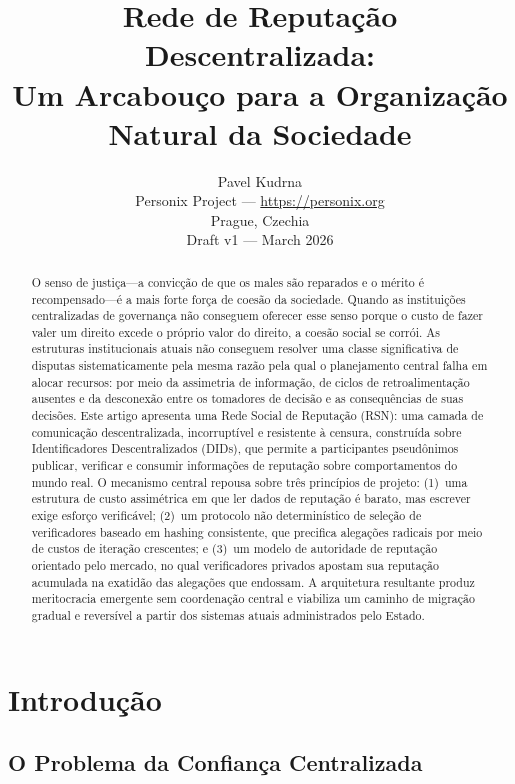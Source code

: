 \documentclass[11pt,a4paper,twocolumn]{article}
\title{\textbf{Rede de Reputação Descentralizada:\\Um Arcabouço para a Organização Natural da Sociedade}}
\author{Pavel Kudrna\\Personix Project --- \url{https://personix.org}\\Prague, Czechia\\Draft v1 --- March 2026}
\date{}
\begin{document}
\maketitle

\begin{abstract}
O senso de justiça---a convicção de que os males são reparados e o mérito é recompensado---é a mais forte força de coesão da sociedade. Quando as instituições centralizadas de governança não conseguem oferecer esse senso porque o custo de fazer valer um direito excede o próprio valor do direito, a coesão social se corrói. As estruturas institucionais atuais não conseguem resolver uma classe significativa de disputas sistematicamente pela mesma razão pela qual o planejamento central falha em alocar recursos: por meio da assimetria de informação, de ciclos de retroalimentação ausentes e da desconexão entre os tomadores de decisão e as consequências de suas decisões. Este artigo apresenta uma Rede Social de Reputação (RSN): uma camada de comunicação descentralizada, incorruptível e resistente à censura, construída sobre Identificadores Descentralizados (DIDs), que permite a participantes pseudônimos publicar, verificar e consumir informações de reputação sobre comportamentos do mundo real. O mecanismo central repousa sobre três princípios de projeto: (1)~uma estrutura de custo assimétrica em que ler dados de reputação é barato, mas escrever exige esforço verificável; (2)~um protocolo não determinístico de seleção de verificadores baseado em hashing consistente, que precifica alegações radicais por meio de custos de iteração crescentes; e (3)~um modelo de autoridade de reputação orientado pelo mercado, no qual verificadores privados apostam sua reputação acumulada na exatidão das alegações que endossam. A arquitetura resultante produz meritocracia emergente sem coordenação central e viabiliza um caminho de migração gradual e reversível a partir dos sistemas atuais administrados pelo Estado.
\end{abstract}

\section{Introdução}

\subsection{O Problema da Confiança Centralizada}
\end{document}
